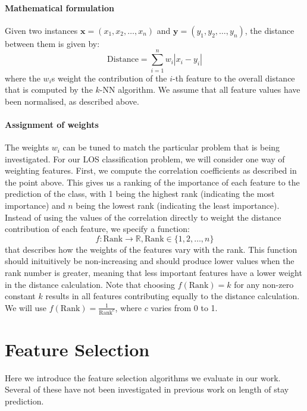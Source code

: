 \documentclass{article}
\begin{document}
\paragraph{Mathematical formulation}
Given two instances $\mathbf{x} = (x_1,x_2,\ldots,x_n)$ and
$\mathbf{y} = (y_1,y_2,\ldots,y_n)$, the distance between them is given by:
\begin{equation*}
\mathrm{Distance} = \sum_{i=1}^n w_i |x_i-y_i|
\end{equation*}
where the $w_i$s weight the contribution of the $i$-th feature to the overall
distance that is computed by the $k$-NN algorithm. We assume that all feature
values have been normalised, as described above.

\paragraph{Assignment of weights}
The weights $w_i$ can be tuned to match the particular problem that is being
investigated. For our LOS classification problem, we will consider one way
of weighting features.
First, we compute the correlation coefficients as described in the point above.
This gives us a ranking of the importance of each feature to the prediction of
the class, with 1 being the highest rank (indicating the most importance) and
$n$ being the lowest rank (indicating the least importance).
Instead of using the values of the correlation directly to weight
the distance contribution of each feature, we specify a function:
\begin{equation*}
f : \mathrm{Rank} \rightarrow \mathbb{R}, \mathrm{Rank} \in \{1,2,\ldots,n\}
\end{equation*}
that describes
how the weights of the features vary with the rank. This function should
inituitively be non-increasing and should produce lower values when the rank
number is greater, meaning that less important features have a lower weight
in the distance calculation.
Note that choosing $f(\mathrm{Rank}) = k$ for any non-zero constant $k$
results in all features contributing equally to the distance calculation.
We will use $f(\mathrm{Rank}) = \frac{1}{\mathrm{Rank}^c}$, where
$c$ varies from 0 to 1.

\section{Feature Selection}
\label{sec:features}
Here we introduce the feature selection algorithms we evaluate in our work.
Several of these have not been investigated in previous work on length of
stay prediction.
\end{document}
